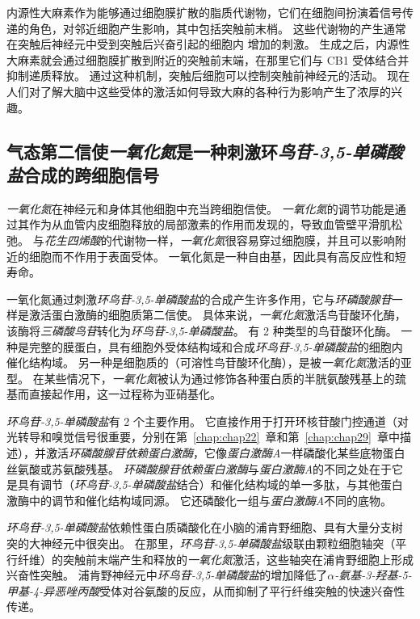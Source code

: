 内源性大麻素作为能够通过细胞膜扩散的脂质代谢物，它们在细胞间扮演着信号传递的角色，对邻近细胞产生影响，其中包括突触前末梢。
这些代谢物的产生通常在突触后神经元中受到突触后兴奋引起的细胞内  增加的刺激。
生成之后，内源性大麻素就会通过细胞膜扩散到附近的突触前末端，在那里它们与 CB1 受体结合并抑制递质释放。
通过这种机制，突触后细胞可以控制突触前神经元的活动。 
现在人们对了解大脑中这些受体的激活如何导致大麻的各种行为影响产生了浓厚的兴趣。



\subsection{气态第二信使\textit{一氧化氮}是一种刺激环\textit{鸟苷-3,5-单磷酸盐}合成的跨细胞信号}

\textit{一氧化氮}在神经元和身体其他细胞中充当跨细胞信使。
\textit{一氧化氮}的调节功能是通过其作为从血管内皮细胞释放的局部激素的作用而发现的，导致血管壁平滑肌松弛。
与\textit{花生四烯酸}的代谢物一样，\textit{一氧化氮}很容易穿过细胞膜，并且可以影响附近的细胞而不作用于表面受体。
一氧化氮是一种自由基，因此具有高反应性和短寿命。


一氧化氮通过刺激\textit{环鸟苷-3,5-单磷酸盐}的合成产生许多作用，它与\textit{环磷酸腺苷}一样是激活蛋白激酶的细胞质第二信使。
具体来说，\textit{一氧化氮}激活鸟苷酸环化酶，该酶将\textit{三磷酸鸟苷}转化为\textit{环鸟苷-3,5-单磷酸盐}。
有 2 种类型的鸟苷酸环化酶。
一种是完整的膜蛋白，具有细胞外受体结构域和合成\textit{环鸟苷-3,5-单磷酸盐}的细胞内催化结构域。
另一种是细胞质的（可溶性鸟苷酸环化酶），是被\textit{一氧化氮}激活的亚型。
在某些情况下，\textit{一氧化氮}被认为通过修饰各种蛋白质的半胱氨酸残基上的巯基而直接起作用，这一过程称为亚硝基化。


\textit{环鸟苷-3,5-单磷酸盐}有 2 个主要作用。
它直接作用于打开环核苷酸门控通道（对光转导和嗅觉信号很重要，分别在第~\ref{chap:chap22}~章和第~\ref{chap:chap29}~章中描述），并激活\textit{环磷酸腺苷依赖蛋白激酶}，它像\textit{蛋白激酶A}一样磷酸化某些底物蛋白 丝氨酸或苏氨酸残基。
\textit{环磷酸腺苷依赖蛋白激酶}与\textit{蛋白激酶A}的不同之处在于它是具有调节（\textit{环鸟苷-3,5-单磷酸盐}结合）和催化结构域的单一多肽，与其他蛋白激酶中的调节和催化结构域同源。
它还磷酸化一组与\textit{蛋白激酶A}不同的底物。


\textit{环鸟苷-3,5-单磷酸盐}依赖性蛋白质磷酸化在小脑的浦肯野细胞、具有大量分支树突的大神经元中很突出。
在那里，\textit{环鸟苷-3,5-单磷酸盐}级联由颗粒细胞轴突（平行纤维）的突触前末端产生和释放的\textit{一氧化氮}激活，这些轴突在浦肯野细胞上形成兴奋性突触。
浦肯野神经元中\textit{环鸟苷-3,5-单磷酸盐}的增加降低了\textit{$\alpha$-氨基-3-羟基-5-甲基-4-异恶唑丙酸}受体对谷氨酸的反应，从而抑制了平行纤维突触的快速兴奋性传递。



